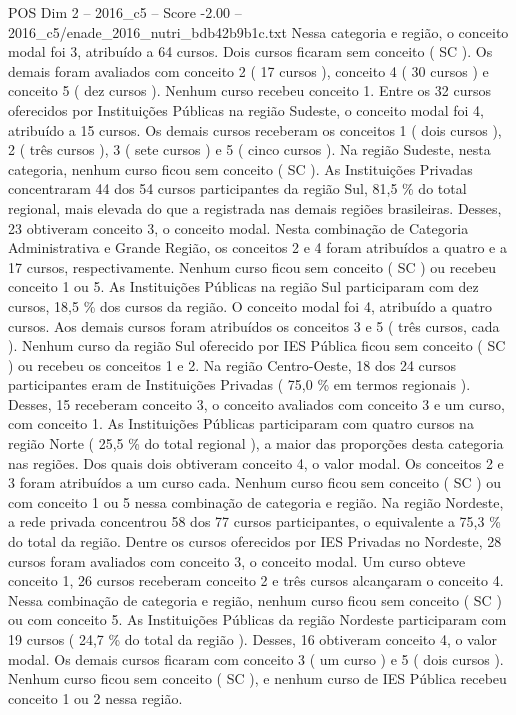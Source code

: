 \begin{textsample}{POS Dim 2 – 2016\_c5 – Score -2.00 – 2016\_c5/enade\_2016\_nutri\_bdb42b9b1c.txt}
Nessa categoria e região, o conceito modal foi 3, atribuído a 64 cursos.
Dois cursos ficaram sem conceito ( SC ).
Os demais foram avaliados com conceito 2 ( 17 cursos ), conceito 4 ( 30 cursos ) e conceito 5 ( dez cursos ).
Nenhum curso recebeu conceito 1.
Entre os 32 cursos oferecidos por Instituições Públicas na região Sudeste, o conceito modal foi 4, atribuído a 15 cursos.
Os demais cursos receberam os conceitos 1 ( dois cursos ), 2 ( três cursos ), 3 ( sete cursos ) e 5 ( cinco cursos ).
Na região Sudeste, nesta categoria, nenhum curso ficou sem conceito ( SC ).
As Instituições Privadas concentraram 44 dos 54 cursos participantes da região Sul, 81,5 \% do total regional, mais elevada do que a registrada nas demais regiões brasileiras.
Desses, 23 obtiveram conceito 3, o conceito modal.
Nesta combinação de Categoria Administrativa e Grande Região, os conceitos 2 e 4 foram atribuídos a quatro e a 17 cursos, respectivamente.
Nenhum curso ficou sem conceito ( SC ) ou recebeu conceito 1 ou 5.
As Instituições Públicas na região Sul participaram com dez cursos, 18,5 \% dos cursos da região.
O conceito modal foi 4, atribuído a quatro cursos.
Aos demais cursos foram atribuídos os conceitos 3 e 5 ( três cursos, cada ).
Nenhum curso da região Sul oferecido por IES Pública ficou sem conceito ( SC ) ou recebeu os conceitos 1 e 2.
Na região Centro-Oeste, 18 dos 24 cursos participantes eram de Instituições Privadas ( 75,0 \% em termos regionais ).
Desses, 15 receberam conceito 3, o conceito avaliados com conceito 3 e um curso, com conceito 1.
As Instituições Públicas participaram com quatro cursos na região Norte ( 25,5 \% do total regional ), a maior das proporções desta categoria nas regiões.
Dos quais dois obtiveram conceito 4, o valor modal.
Os conceitos 2 e 3 foram atribuídos a um curso cada.
Nenhum curso ficou sem conceito ( SC ) ou com conceito 1 ou 5 nessa combinação de categoria e região.
Na região Nordeste, a rede privada concentrou 58 dos 77 cursos participantes, o equivalente a 75,3 \% do total da região.
Dentre os cursos oferecidos por IES Privadas no Nordeste, 28 cursos foram avaliados com conceito 3, o conceito modal.
Um curso obteve conceito 1, 26 cursos receberam conceito 2 e três cursos alcançaram o conceito 4.
Nessa combinação de categoria e região, nenhum curso ficou sem conceito ( SC ) ou com conceito 5.
As Instituições Públicas da região Nordeste participaram com 19 cursos ( 24,7 \% do total da região ).
Desses, 16 obtiveram conceito 4, o valor modal.
Os demais cursos ficaram com conceito 3 ( um curso ) e 5 ( dois cursos ).
Nenhum curso ficou sem conceito ( SC ), e nenhum curso de IES Pública recebeu conceito 1 ou 2 nessa região.

\end{textsample}
